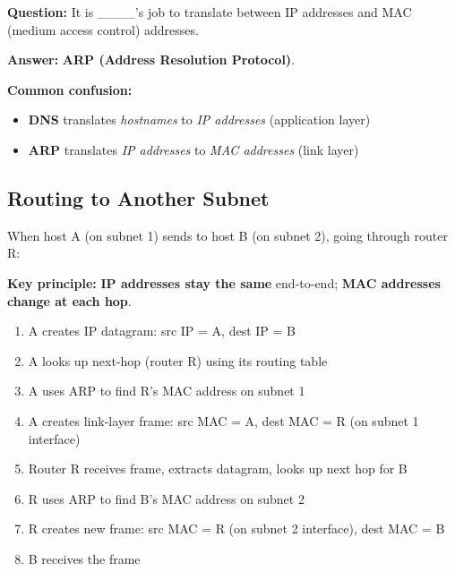 \begin{exambox}
\textbf{Question:} It is \_\_\_\_'s job to translate between IP addresses and MAC (medium access control) addresses.

\textbf{Answer:} \textbf{ARP (Address Resolution Protocol)}.

\medskip
\textbf{Common confusion:}
\begin{itemize}[noitemsep]
    \item \textbf{DNS} translates \emph{hostnames} to \emph{IP addresses} (application layer)
    \item \textbf{ARP} translates \emph{IP addresses} to \emph{MAC addresses} (link layer)
\end{itemize}
\end{exambox}

\begin{imagebox}
\end{imagebox}

\subsection{Routing to Another Subnet}

\begin{keybox}
When host A (on subnet 1) sends to host B (on subnet 2), going through router R:

\textbf{Key principle:} \textbf{IP addresses stay the same} end-to-end; \textbf{MAC addresses change at each hop}.

\begin{enumerate}[noitemsep]
    \item A creates IP datagram: src IP = A, dest IP = B
    \item A looks up next-hop (router R) using its routing table
    \item A uses ARP to find R's MAC address on subnet 1
    \item A creates link-layer frame: src MAC = A, dest MAC = R (on subnet 1 interface)
    \item Router R receives frame, extracts datagram, looks up next hop for B
    \item R uses ARP to find B's MAC address on subnet 2
    \item R creates new frame: src MAC = R (on subnet 2 interface), dest MAC = B
    \item B receives the frame
\end{enumerate}
\end{keybox}

